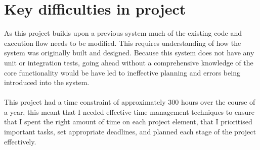 \section{Key difficulties in project}
As this project builds upon a previous system much of the existing code and execution flow needs to be modified. This requires understanding of how the system was originally built and designed. Because this system does not have any unit or integration tests, going ahead without a comprehensive knowledge of the core functionality would be have led to ineffective planning and errors being introduced into the system.
\\\\
This project had a time constraint of approximately 300 hours over the course of a year, this meant that I needed effective time management techniques to ensure that I spent the right amount of time on each project element, that I prioritised important tasks, set appropriate deadlines, and planned each stage of the project effectively.

